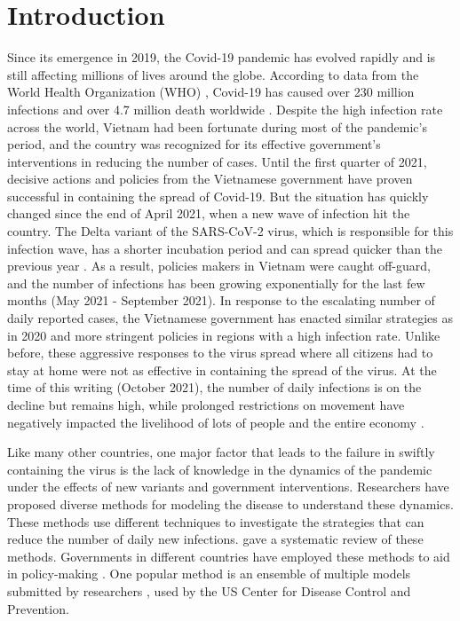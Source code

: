 \chapter{Introduction}
\label{chap:introduction}

Since its emergence in 2019, the Covid-19 pandemic has evolved rapidly and is still affecting millions of lives around the globe.
According to data from the World Health Organization (WHO) \cite{WHOCoronavirusCOVID19}, Covid-19 has caused over 230 million infections and over 4.7 million death worldwide .
Despite the high infection rate across the world, Vietnam had been fortunate during most of the pandemic's period, and the country was recognized for its effective government's interventions in reducing the number of cases.
Until the first quarter of 2021, decisive actions and policies from the Vietnamese government have proven successful in containing the spread of Covid-19.
But the situation has quickly changed since the end of April 2021, when a new wave of infection hit the country.
The Delta variant of the SARS-CoV-2 virus, which is responsible for this infection wave, has a shorter incubation period and can spread quicker than the previous year \cite{mahaseDeltaVariantWhat2021}.
As a result, policies makers in Vietnam were caught off-guard, and the number of infections has been growing exponentially for the last few months (May 2021 - September 2021).
In response to the escalating number of daily reported cases, the Vietnamese government has enacted similar strategies as in 2020 and more stringent policies in regions with a high infection rate.
Unlike before, these aggressive responses to the virus spread where all citizens had to stay at home were not as effective in containing the spread of the virus.
At the time of this writing (October 2021), the number of daily infections is on the decline but remains high, while prolonged restrictions on movement have negatively impacted the livelihood of lots of people and the entire economy \cite{RapidAssessmentDesign}.

Like many other countries, one major factor that leads to the failure in swiftly containing the virus is the lack of knowledge in the dynamics of the pandemic under the effects of new variants and government interventions.
Researchers have proposed diverse methods for modeling the disease to understand these dynamics.
These methods use different techniques to investigate the strategies that can reduce the number of daily new infections.
\citeauthor{rahimiReviewCOVID19Forecasting2021} \cite{rahimiReviewCOVID19Forecasting2021} gave a systematic review of these methods.
Governments in different countries have employed these methods to aid in policy-making \cite{adamSpecialReportSimulations2020}.
One popular method is an ensemble of multiple models submitted by researchers \cite{rayEnsembleForecastsCoronavirus2020}, used by the \gls{US} Center for Disease Control and Prevention.

